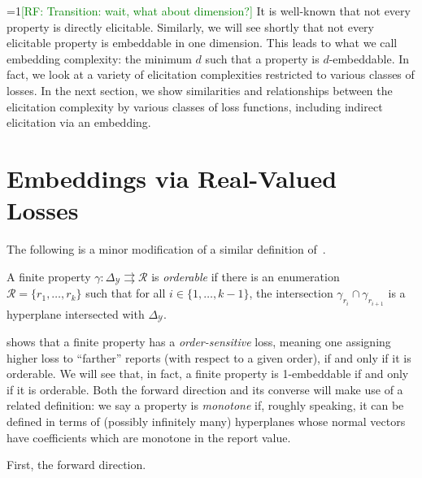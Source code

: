 \documentclass[anon,12pt]{colt2019}
\newcommand{\Comments}{1}
\newcommand{\mynote}[2]{\ifnum\Comments=1\textcolor{#1}{#2}\fi}
\newcommand{\raf}[1]{\mynote{green}{[RF: #1]}}
\newcommand{\simplex}{\Delta_\Y}
\newcommand{\R}{\mathcal{R}}
\newcommand{\Y}{\mathcal{Y}}
\newcommand{\toto}{\rightrightarrows}
\begin{document}
\raf{Transition: wait, what about dimension?}
It is well-known that not every property is directly elicitable.
Similarly, we will see shortly that not every elicitable property is embeddable in one dimension.
This leads to what we call embedding complexity: the minimum $d$ such that a property is $d$-embeddable.
In fact, we look at a variety of elicitation complexities restricted to various classes of losses.
In the next section, we show similarities and relationships between the elicitation complexity by various classes of loss functions, including indirect elicitation via an embedding.

\section{Embeddings via Real-Valued Losses}

The following is a minor modification of a similar definition of~\citet{lambert2018elicitation}.
\begin{definition}
  A finite property $\gamma:\simplex\toto\R$ is \emph{orderable} if there is an enumeration $\R = \{r_1,\ldots,r_k\}$ such that for all $i\in\{1,\ldots,k-1\}$, the intersection $\gamma_{r_i} \cap \gamma_{r_{i+1}}$ is a hyperplane intersected with $\simplex$.
\end{definition}

\citet{lambert2018elicitation} shows that a finite property has a \emph{order-sensitive} loss, meaning one assigning higher loss to ``farther'' reports (with respect to a given order), if and only if it is orderable.
We will see that, in fact, a finite property is 1-embeddable if and only if it is orderable.
Both the forward direction and its converse will make use of a related definition: we say a property is \emph{monotone} if, roughly speaking, it can be defined in terms of (possibly infinitely many) hyperplanes whose normal vectors have coefficients which are monotone in the report value.

First, the forward direction.
\end{document}

